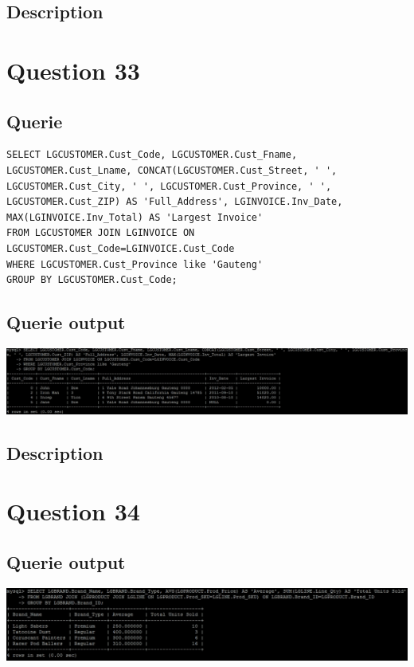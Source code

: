 \documentclass[a4paper,10pt]{article}
\begin{document}
\subsection{Description}\section*{Question 33}
 \subsection{Querie}
          \lstset{
            language=SQL,
            breaklines=true
            }
        \begin{lstlisting}[frame=single]
        SELECT LGCUSTOMER.Cust_Code, LGCUSTOMER.Cust_Fname, LGCUSTOMER.Cust_Lname, CONCAT(LGCUSTOMER.Cust_Street, ' ', LGCUSTOMER.Cust_City, ' ', LGCUSTOMER.Cust_Province, ' ', LGCUSTOMER.Cust_ZIP) AS 'Full_Address', LGINVOICE.Inv_Date, MAX(LGINVOICE.Inv_Total) AS 'Largest Invoice'
FROM LGCUSTOMER JOIN LGINVOICE ON LGCUSTOMER.Cust_Code=LGINVOICE.Cust_Code
WHERE LGCUSTOMER.Cust_Province like 'Gauteng'
GROUP BY LGCUSTOMER.Cust_Code;

        \end{lstlisting}
\subsection{Querie output}
           \includegraphics{Queries/Question_33/Q33_screenshot.jpg}
\subsection{Description}\section*{Question 34}
\subsection{Querie output}
           \includegraphics{Queries/Question_34/Q34_screenshot.jpg}
\end{document}
